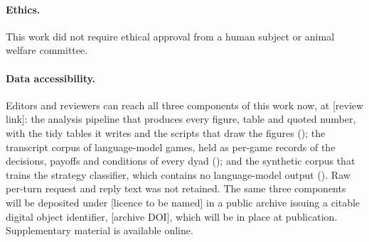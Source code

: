 \documentclass[11pt,a4paper]{article}
\begin{document}
\paragraph{Ethics.} This work did not require ethical approval from a human
subject or animal welfare committee.

\paragraph{Data accessibility.} Editors and reviewers can reach all three
components of this work now, at [review link]: the analysis pipeline that
produces every figure, table and quoted number, with the tidy tables it writes
and the scripts that draw the figures (); the transcript
corpus of language-model games, held as per-game records of the decisions,
payoffs and conditions of every dyad ();
and the synthetic corpus that trains the strategy classifier, which contains no
language-model output (). Raw per-turn request and
reply text was not retained. The same three components will be deposited under
[licence to be named] in a public archive issuing a citable digital object
identifier, [archive DOI], which will be in place at publication. Supplementary
material is available online.
\end{document}
